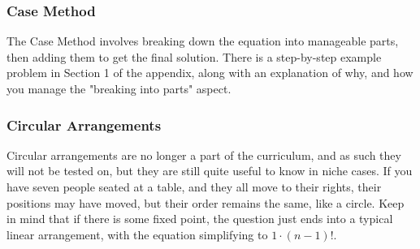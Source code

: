        \subsubsection{Case Method}
        The Case Method involves breaking down the equation into manageable parts, then adding them to get the final solution.
        There is a step-by-step example problem in Section 1 of the appendix, along with an explanation of why, and how you manage the "breaking into parts" aspect.
    
        \subsubsection{Circular Arrangements}
        Circular arrangements are no longer a part of the curriculum, and as such they will not be tested on, but they are still quite useful to know in niche cases.
        If you have seven people seated at a table, and they all move to their rights, their positions may have moved, but their order remains the same, like a circle.
        Keep in mind that if there is some fixed point, the question just ends into a typical linear arrangement, with the equation simplifying to $1 \cdot (n-1)!$.